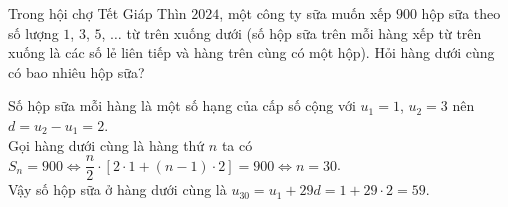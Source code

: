 \begin{bt}%
    Trong hội chợ Tết Giáp Thìn $2024$, một công ty sữa muốn xếp $900$ hộp sữa theo số lượng $1$, $3$, $5$, $\ldots$ từ trên xuống dưới (số hộp sữa trên mỗi hàng xếp từ trên xuống là các số lẻ liên tiếp và hàng trên cùng có một hộp). Hỏi hàng dưới cùng có bao nhiêu hộp sữa?
    \loigiai
    {Số hộp sữa mỗi hàng là một số hạng của cấp số cộng với $u_1=1$, $u_2=3$ nên $d=u_2-u_1=2$.\\
        Gọi hàng dưới cùng là hàng thứ $n$ ta có $S_n=900\Leftrightarrow \dfrac{n}{2}\cdot \left[2\cdot 1+(n-1)\cdot 2\right]=900\Leftrightarrow n=30$.\\
        Vậy số hộp sữa ở hàng dưới cùng là $u_{30}=u_1+29d=1+29\cdot 2=59$. 
        
    }
\end{bt}

